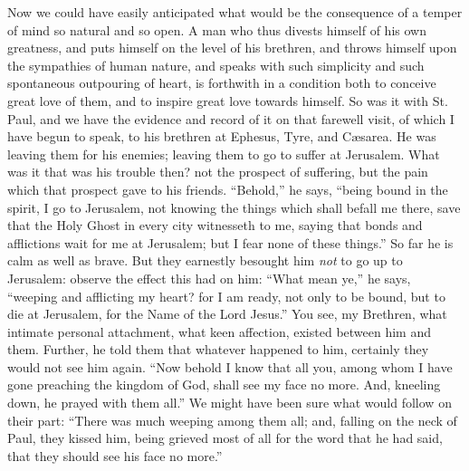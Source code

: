 Now we could have easily anticipated what would be the
consequence of a temper of mind so natural and so open. A
man who thus divests himself of his own greatness, and
puts himself on the level of his brethren, and throws
himself upon the sympathies of human nature, and speaks
with such simplicity and such spontaneous outpouring of
heart, is forthwith in a condition both to conceive great
love of them, and to inspire great love towards himself.
So was it with St. Paul, and we have the evidence and
record of it on that farewell visit, of which I have
begun to speak, to his brethren at Ephesus, Tyre, and Cæsarea. He was leaving them for his enemies; leaving
them to go to suffer at Jerusalem. What was it that was
his trouble then? not the prospect of suffering, but the
pain which that prospect gave to his friends.
``Behold,'' he says, ``being bound in the
spirit, I go to Jerusalem, not knowing the things which
shall befall me there, save that the Holy Ghost in every
city witnesseth to me, saying that bonds and afflictions
wait for me at Jerusalem; but I fear none of these
things.'' So far he is calm as well as brave. But
they earnestly besought him \emph{not} to go up to
Jerusalem: observe the effect this had on him: ``What
mean ye,'' he says, ``weeping and afflicting my
heart? for I am ready, not only to be bound, but to die
at Jerusalem, for the Name of the Lord Jesus.'' You
see, my Brethren, what intimate personal attachment, what
keen affection, existed between him and them. Further, he
told them that whatever happened to him, certainly they
would not see him again. ``Now behold I know that all
you, among whom I have gone preaching the kingdom of God,
shall see my face no more. And, kneeling down, he prayed
with them all.'' We might have been sure what would
follow on their part: ``There was much weeping among
them all; and, falling on the neck of Paul, they kissed
him, being grieved most of all for the word that he had
said, that they should see his face no more.''

